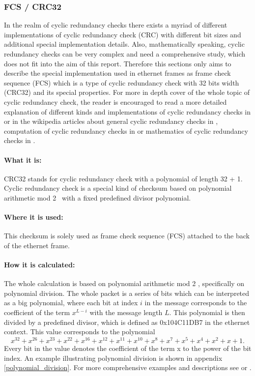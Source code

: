 \subsubsection{FCS / CRC32}\label{section:fcs}
In the realm of cyclic redundancy checks there exists a myriad of different implementations of cyclic redundancy check (CRC) with different bit sizes and additional special implementation details. Also, mathematically speaking, cyclic redundancy checks can be very complex and need a comprehensive study, which does not fit into the aim of this report. Therefore this sections only aims to describe the special implementation used in ethernet frames as frame check sequence (FCS) which is a type of cyclic redundancy check with 32 bits width (CRC32) and its special properties. For more in depth cover of the whole topic of cyclic redundancy check, the reader is encouraged to read a more detailed explanation of different kinds and implementations of cyclic redundancy checks in \cite{zlib.net:crc} or in the wikipedia articles about general cyclic redundancy checks in \cite{wikipedia.org:crc}, computation of cyclic redundancy checks in \cite{wikipedia.org:comp_crc} or mathematics of cyclic redundancy checks in \cite{wikipedia.org:math_crc}.

\paragraph{What it is:}
CRC32 stands for cyclic redundancy check with a polynomial of length 32 + 1. Cyclic redundancy check is a special kind of checksum based on polynomial arithmetic mod 2~\cite{wikipedia.org:crc} with a fixed predefined divisor polynomial.

\paragraph{Where it is used:}
This checksum is solely used as frame check sequence (FCS) attached to the back of the ethernet frame.

\paragraph{How it is calculated:}
The whole calculation is based on polynomial arithmetic mod 2 \cite{wikipedia.org:crc}, specifically on polynomial division. The whole packet is a series of bits which can be interpreted as a big polynomial, where each bit at index $i$ in the message corresponds to the coefficient of the term \(x^{L - i}\) with the message length $L$. This polynomial is then divided by a predefined divisor, which is defined as 0x104C11DB7 in the ethernet context. This value corresponds to the polynomial
\begin{equation}
  x^{32} + x^{26} + x^{23} + x^{22} + x^{16} + x^{12} + x^{11} + x^{10} + x^{8} + x^{7} + x^{5} + x^{4} + x^{2} + x + 1.
\end{equation}
Every bit in the value denotes the coefficient of the term x to the power of the bit index. An example illustrating polynomial division is shown in appendix \ref{polynomial_division}. For more comprehensive examples and descriptions see \cite{wikipedia.org:crc} or \cite{zlib.net:crc}.

